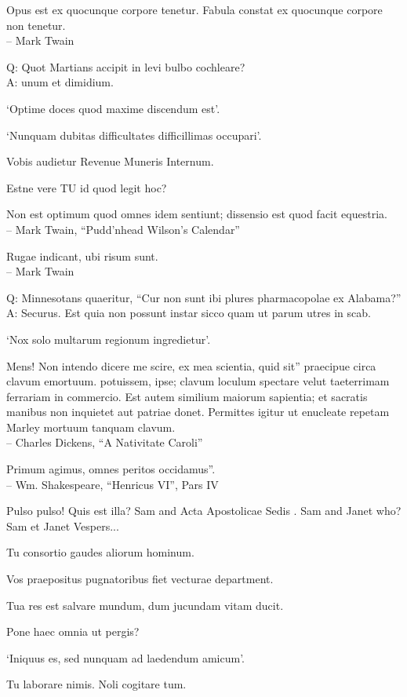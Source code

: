 \documentclass[titlepage,12pt]{memoir}
\begin{document}
Opus est ex quocunque corpore tenetur.
Fabula constat ex quocunque corpore non tenetur.
\\-- Mark Twain

Q: Quot Martians accipit in levi bulbo cochleare?\\
A: unum et dimidium.

‘Optime doces quod maxime discendum est’.

‘Nunquam dubitas difficultates difficillimas occupari’.

Vobis audietur Revenue Muneris Internum.

Estne vere TU id quod legit hoc?

Non est optimum quod omnes idem sentiunt; dissensio est
quod facit equestria.
\\-- Mark Twain, “Pudd’nhead Wilson’s Calendar”

Rugae indicant, ubi risum sunt.
\\-- Mark Twain

Q: Minnesotans quaeritur, “Cur non sunt ibi plures pharmacopolae ex Alabama?”\\
A: Securus. Est quia non possunt instar sicco quam ut parum
utres in scab.

‘Nox solo multarum regionum ingredietur’.

Mens! Non intendo dicere me scire, ex mea scientia, quid sit”
praecipue circa clavum emortuum. potuissem, ipse;
clavum loculum spectare velut taeterrimam ferrariam in commercio.
Est autem similium maiorum sapientia; et sacratis manibus
non inquietet aut patriae donet. Permittes igitur
ut enucleate repetam Marley mortuum tanquam clavum.
\\-- Charles Dickens, “A Nativitate Caroli”

Primum agimus, omnes peritos occidamus”.
\\-- Wm. Shakespeare, “Henricus VI”, Pars IV

Pulso pulso!
Quis est illa?
Sam and Acta Apostolicae Sedis .
Sam and Janet who?
Sam et Janet Vespers...

Tu consortio gaudes aliorum hominum.

Vos praepositus pugnatoribus fiet
vecturae department.

Tua res est salvare mundum, dum jucundam vitam ducit.

Pone haec omnia ut pergis?

‘Iniquus es, sed nunquam ad laedendum amicum’.

Tu laborare nimis. Noli cogitare tum.
\end{document}
